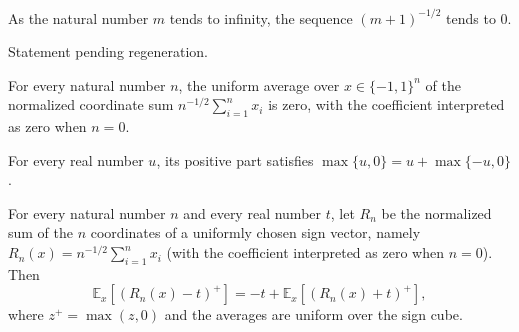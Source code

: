 \begin{theorem}
\label{FABL.tendsto_normalizedRademacherCoefficient_succ}
\leanok
{}
As the natural number $m$ tends to infinity, the sequence $(m+1)^{-1/2}$ tends to $0$.
\end{theorem}

\begin{theorem}
\label{FABL.tendsto_expect_hammingUpperTailIndicator}
\leanok
{}
Statement pending regeneration.
\end{theorem}

\begin{theorem}
\label{FABL.expect_normalizedRademacherSum_eq_zero}
\leanok
{}
For every natural number $n$, the uniform average over $x\in\{−1,1\}^n$ of the
normalized coordinate sum $n^{-1/2}\sum_{i=1}^n x_i$ is zero, with the coefficient
interpreted as zero when $n=0$.
\end{theorem}

\begin{theorem}
\label{FABL.posPart_eq_self_add_neg_posPart}
\leanok
{}
For every real number $u$, its positive part satisfies $\max\{u,0\}=u+\max\{−u,0\}$.
\end{theorem}

\begin{theorem}
\label{FABL.expect_normalizedRademacherStopLoss_reflection}
\leanok
{}
For every natural number $n$ and every real number $t$, let $R_n$ be the normalized sum
of the $n$ coordinates of a uniformly chosen sign vector, namely
$R_n(x)=n^{-1/2}\sum_{i=1}^n x_i$ (with the coefficient interpreted as zero when $n=0$).
Then
\[
\mathbb E_x[(R_n(x)-t)^+]=-t+\mathbb E_x[(R_n(x)+t)^+],
\]
where $z^+=\max(z,0)$ and the averages are uniform over the sign cube.
\end{theorem}

